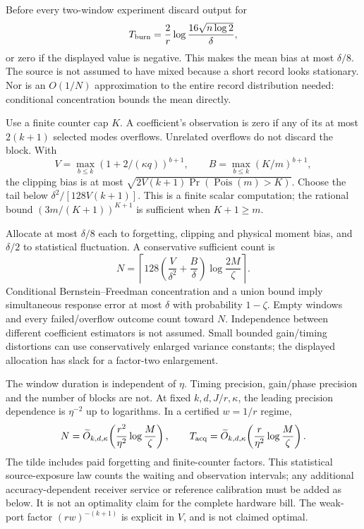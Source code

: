 \documentclass[11pt]{article}
\begin{document}
Before every two-window experiment discard output for
\[
 T_{\rm burn}=\frac2r\log\frac{16\sqrt{n\log2}}{\delta},
\]
or zero if the displayed value is negative. This makes the mean bias at most \(\delta/8\). The source is not assumed to have mixed because a short record looks stationary. Nor is an \(O(1/N)\) approximation to the entire record distribution needed: conditional concentration bounds the mean directly.

Use a finite counter cap \(K\). A coefficient's observation is zero if any of its at most \(2(k+1)\) selected modes overflows. Unrelated overflows do not discard the block. With
\[
 V=\max_{b\le k}(1+2/(\kappa q))^{b+1},\qquad
 B=\max_{b\le k}(K/m)^{b+1},
\]
the clipping bias is at most
\(\sqrt{2V(k+1)\Pr(\operatorname{Pois}(m)>K)}\).
Choose the tail below \(\delta^2/[128V(k+1)]\). This is a finite scalar computation; the rational bound
\((3m/(K+1))^{K+1}\) is sufficient when \(K+1\ge m\).

Allocate at most \(\delta/8\) each to forgetting, clipping and physical moment bias, and \(\delta/2\) to statistical fluctuation. A conservative sufficient count is
\begin{equation}
 N=\left\lceil128\left(\frac V{\delta^2}+\frac B\delta\right)
 \log\frac{2M}{\zeta}\right\rceil.
 \label{eq:shots}
\end{equation}
Conditional Bernstein--Freedman concentration and a union bound imply simultaneous response error at most \(\delta\) with probability \(1-\zeta\). Empty windows and every failed/overflow outcome count toward \(N\). Independence between different coefficient estimators is not assumed. Small bounded gain/timing distortions can use conservatively enlarged variance constants; the displayed allocation has slack for a factor-two enlargement.

The window duration is independent of \(\eta\). Timing precision, gain/phase precision and the number of blocks are not. At fixed \(k,d,J/r,\kappa\), the leading precision dependence is \(\eta^{-2}\) up to logarithms. In a certified \(w=1/r\) regime,
\[
 N=\widetilde O_{k,d,\kappa}\!\left(\frac{r^2}{\eta^2}
 \log\frac M\zeta\right),\qquad
 T_{\rm acq}=\widetilde O_{k,d,\kappa}\!\left(\frac r{\eta^2}
 \log\frac M\zeta\right).
\]
The tilde includes paid forgetting and finite-counter factors. This statistical source-exposure law counts the waiting and observation intervals; any additional accuracy-dependent receiver service or reference calibration must be added as below. It is not an optimality claim for the complete hardware bill. The weak-port factor \((rw)^{-(k+1)}\) is explicit in \(V\), and is not claimed optimal.
\end{document}
